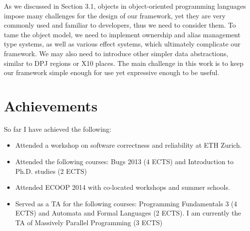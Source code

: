 \documentclass[]{usiinfprospectus}
\begin{document}
As we discussed in Section 3.1, objects in object-oriented programming languages impose many challenges for the design of our framework, yet they are very commonly used and familiar to developers, thus we need to consider them. To tame the object model, we need to implement ownership and alias management type systems, as well as various effect systems, which ultimately complicate our framework. We may also need to introduce other simpler data abstractions, similar to DPJ regions or X10 places. The main challenge in this work is to keep our framework simple enough for use yet expressive enough to be useful.



\section{Achievements}
So far I have achieved the following:
\begin{itemize}
	\itemsep0em
	\item Attended a workshop on software correctness and reliability at ETH Zurich.
	\item Attended the following courses: Bugs 2013 (4 ECTS) and Introduction to Ph.D. studies (2 ECTS) 
	\item Attended ECOOP 2014 with co-located workshops and summer schools.
	\item Served as a TA for the following courses: Programming Fundamentals 3 (4 ECTS) and Automata and Formal Languages (2 ECTS). I am currently the TA of Massively Parallel Programming (3 ECTS) 
\end{itemize}


\end{document}
